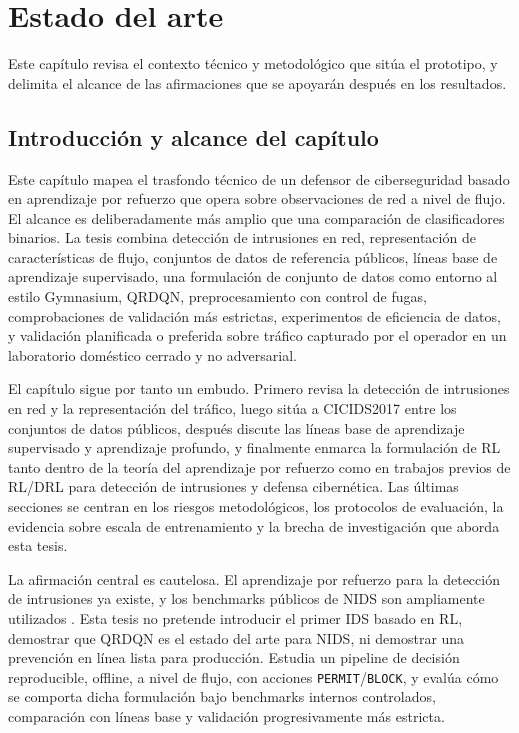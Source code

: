 \chapter{Estado del arte}

Este capítulo revisa el contexto técnico y metodológico que sitúa el prototipo, y delimita el alcance de las afirmaciones que se apoyarán después en los resultados.

\section{Introducción y alcance del capítulo}

Este capítulo mapea el trasfondo técnico de un defensor de ciberseguridad basado en aprendizaje por refuerzo que opera sobre observaciones de red a nivel de flujo. El alcance es deliberadamente más amplio que una comparación de clasificadores binarios. La tesis combina detección de intrusiones en red, representación de características de flujo, conjuntos de datos de referencia públicos, líneas base de aprendizaje supervisado, una formulación de conjunto de datos como entorno al estilo Gymnasium, QRDQN, preprocesamiento con control de fugas, comprobaciones de validación más estrictas, experimentos de eficiencia de datos, y validación planificada o preferida sobre tráfico capturado por el operador en un laboratorio doméstico cerrado y no adversarial.

El capítulo sigue por tanto un embudo. Primero revisa la detección de intrusiones en red y la representación del tráfico, luego sitúa a CICIDS2017 entre los conjuntos de datos públicos, después discute las líneas base de aprendizaje supervisado y aprendizaje profundo, y finalmente enmarca la formulación de RL tanto dentro de la teoría del aprendizaje por refuerzo como en trabajos previos de RL/DRL para detección de intrusiones y defensa cibernética. Las últimas secciones se centran en los riesgos metodológicos, los protocolos de evaluación, la evidencia sobre escala de entrenamiento y la brecha de investigación que aborda esta tesis.

La afirmación central es cautelosa. El aprendizaje por refuerzo para la detección de intrusiones ya existe, y los benchmarks públicos de NIDS son ampliamente utilizados \parencite{Yang2024DRLNIDSSurvey,Kheddar2025RLIDSReview,Gueriani2024DRLIoTIDSSurvey}. Esta tesis no pretende introducir el primer IDS basado en RL, demostrar que QRDQN es el estado del arte para NIDS, ni demostrar una prevención en línea lista para producción. Estudia un pipeline de decisión reproducible, offline, a nivel de flujo, con acciones \texttt{PERMIT}/\texttt{BLOCK}, y evalúa cómo se comporta dicha formulación bajo benchmarks internos controlados, comparación con líneas base y validación progresivamente más estricta.

